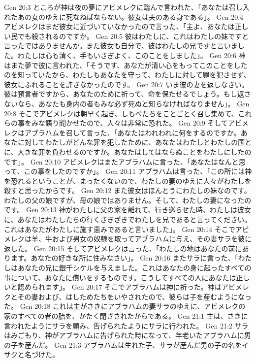 Gen 20:3  ところが神は夜の夢にアビメレクに臨んで言われた、「あなたは召し入れたあの女のゆえに死なねばならない。彼女は夫のある身である」。
Gen 20:4  アビメレクはまだ彼女に近づいていなかったので言った、「主よ、あなたは正しい民でも殺されるのですか。
Gen 20:5  彼はわたしに、これはわたしの妹ですと言ったではありませんか。また彼女も自分で、彼はわたしの兄ですと言いました。わたしは心も清く、手もいさぎよく、このことをしました」。
Gen 20:6  神はまた夢で彼に言われた、「そうです、あなたが清い心をもってこのことをしたのを知っていたから、わたしもあなたを守って、わたしに対して罪を犯させず、彼女にふれることを許さなかったのです。
Gen 20:7  いま彼の妻を返しなさい。彼は預言者ですから、あなたのために祈って、命を保たせるでしょう。もし返さないなら、あなたも身内の者もみな必ず死ぬと知らなければなりません」。
Gen 20:8  そこでアビメレクは朝早く起き、しもべたちをことごとく召し集めて、これらの事をみな語り聞かせたので、人々は非常に恐れた。
Gen 20:9  そしてアビメレクはアブラハムを召して言った、「あなたはわれわれに何をするのですか。あなたに対してわたしがどんな罪を犯したために、あなたはわたしとわたしの国とに、大きな罪を負わせるのですか。あなたはしてはならぬことをわたしにしたのです」。
Gen 20:10  アビメレクはまたアブラハムに言った、「あなたはなんと思って、この事をしたのですか」。
Gen 20:11  アブラハムは言った、「この所には神を恐れるということが、まったくないので、わたしの妻のゆえに人々がわたしを殺すと思ったからです。
Gen 20:12  また彼女はほんとうにわたしの妹なのです。わたしの父の娘ですが、母の娘ではありません。そして、わたしの妻になったのです。
Gen 20:13  神がわたしに父の家を離れて、行き巡らせた時、わたしは彼女に、あなたはわたしたちの行くさきざきでわたしを兄であると言ってください。これはあなたがわたしに施す恵みであると言いました」。
Gen 20:14  そこでアビメレクは羊、牛および男女の奴隷を取ってアブラハムに与え、その妻サラを彼に返した。
Gen 20:15  そしてアビメレクは言った、「わたしの地はあなたの前にあります。あなたの好きな所に住みなさい」。
Gen 20:16  またサラに言った、「わたしはあなたの兄に銀千シケルを与えました。これはあなたの身に起ったすべての事について、あなたに償いをするものです。こうしてすべての人にあなたは正しいと認められます」。
Gen 20:17  そこでアブラハムは神に祈った。神はアビメレクとその妻および、はしためたちをいやされたので、彼らは子を産むようになった。
Gen 20:18  これは主がさきにアブラハムの妻サラのゆえに、アビメレクの家のすべての者の胎を、かたく閉ざされたからである。
Gen 21:1  主は、さきに言われたようにサラを顧み、告げられたようにサラに行われた。
Gen 21:2  サラはみごもり、神がアブラハムに告げられた時になって、年老いたアブラハムに男の子を産んだ。
Gen 21:3  アブラハムは生れた子、サラが産んだ男の子の名をイサクと名づけた。

